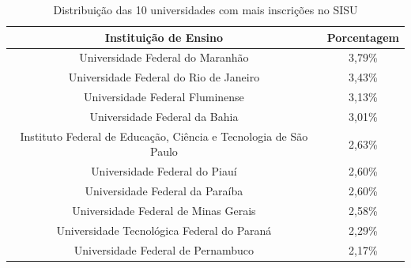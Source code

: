                 \begin{table}[]
                    \centering
                    \begin{tabular}{cc}
                    \hline
                    \textbf{Instituição de Ensino}                                   & \textbf{Porcentagem} \\ \hline
                    Universidade Federal do Maranhão                                 & 3,79\%               \\ \hline
                    Universidade Federal do Rio de Janeiro                           & 3,43\%               \\ \hline
                    Universidade Federal Fluminense                                  & 3,13\%               \\ \hline
                    Universidade Federal da Bahia                                    & 3,01\%               \\ \hline
                    Instituto Federal de Educação, Ciência e Tecnologia de São Paulo & 2,63\%               \\ \hline
                    Universidade Federal do Piauí                                    & 2,60\%               \\ \hline
                    Universidade Federal da Paraíba                                  & 2,60\%               \\ \hline
                    Universidade Federal de Minas Gerais                             & 2,58\%               \\ \hline
                    Universidade Tecnológica Federal do Paraná                       & 2,29\%               \\ \hline
                    Universidade Federal de Pernambuco                               & 2,17\%               \\ \hline
                    \end{tabular}
                    \caption{Distribuição das 10 universidades com mais inscrições no SISU}
                    \label{tab:universidade-inscricao}
                    \end{table}

